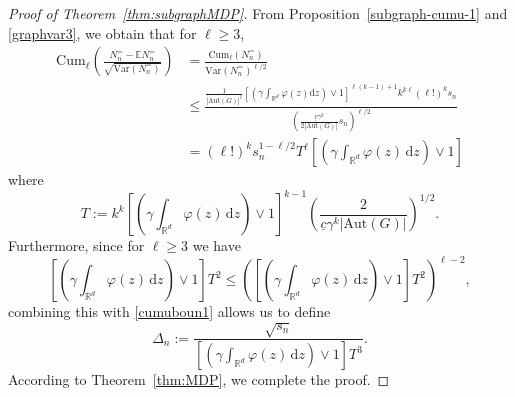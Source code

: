 \documentclass{article}
\theoremstyle{definition}
\numberwithin{equation}{section}
\theoremstyle{remark}
\newcommand{\Var}{\mathrm{Var}}
\newcommand{\cum}{\mathrm{Cum}}
\begin{document}
\begin{proof}[Proof of Theorem~\ref{thm:subgraphMDP}]
	From Proposition~\ref{subgraph-cumu-1} and \eqref{graphvar3}, we obtain that for $\ell\ge3$,
\begin{align}
	\cum_{\ell}\left(\frac{N_n^{=}-\mathbb{E}N_n^{=}}{\sqrt{\Var(N_n^{=})}}\right)&=\frac{\cum_{\ell}(N_n^{=})}{\Var(N_n^{=})^{\ell/2}}\nonumber\\
																&\le\frac{
																\frac{1}{|\mathrm{Aut}(G)|^\ell}\left[\left(\gamma \int_{\mathbb{R}^d}\varphi(z)\mathrm{d}z\right)\vee1\right]^{\ell(k-1)+1}k^{k\ell}(\ell!)^k s_n}{(\frac{\underline{c}\gamma^k}{2|\mathrm{Aut}(G)|}s_n)^{\ell/2}}\nonumber\\
																&=(\ell!)^ks_n^{1-\ell/2}T^\ell\left[\left(\gamma \int_{\mathbb{R}^d}\varphi(z)\,\mathrm{d}z\right)\vee1\right]\label{cumuboun1}
\end{align}
where 
$$
T:=k^k\left[\left(\gamma \int_{\mathbb{R}^d}\varphi(z)\,\mathrm{d}z\right)\vee1\right]^{k-1}\left(\frac2{\underline{c}\gamma^k|\mathrm{Aut}(G)|}\right)^{1/2}.
$$
Furthermore, since for $\ell\ge3$ we have
$$
\left[\left(\gamma \int_{\mathbb{R}^d}\varphi(z)\,\mathrm{d}z\right)\vee1\right]T^2 \le \left(\left[\left(\gamma \int_{\mathbb{R}^d}\varphi(z)\,\mathrm{d}z\right)\vee1\right]T^2\right)^{\ell-2},
$$
combining this with \eqref{cumuboun1} allows us to define
\begin{equation}\label{mdp-const1}
\Delta_n := \frac{\sqrt{s_n}}{\left[\left(\gamma \int_{\mathbb{R}^d}\varphi(z)\,\mathrm{d}z\right)\vee1\right]T^{3}}.
\end{equation}
According to Theorem~\ref{thm:MDP}, we complete the proof.
\end{proof}
\end{document}
